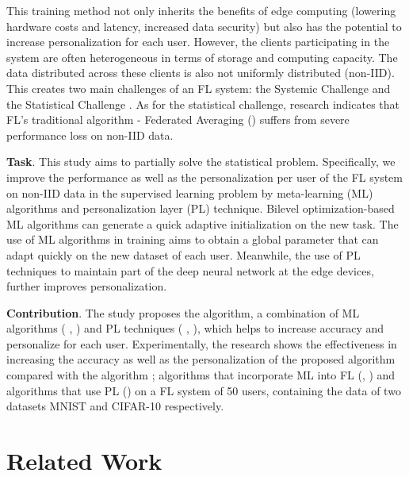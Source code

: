 \documentclass[runningheads]{llncs}
\begin{document}
This training method not only inherits the benefits of edge computing (lowering hardware costs and latency, increased data security) but also has the potential to increase personalization for each user. However, the clients participating in the system are often heterogeneous in terms of storage and computing capacity. The data distributed across these clients is also not uniformly distributed (non-IID). This creates two main challenges of an FL system: the Systemic Challenge and the Statistical Challenge \cite{li2020federated}. As for the statistical challenge, \cite{zhao2018federated} research indicates that FL's traditional algorithm - Federated Averaging () suffers from severe performance loss on non-IID data.

\textbf{Task}. This study aims to partially solve the statistical problem. Specifically, we improve the performance as well as the personalization per user of the FL system on non-IID data in the supervised learning problem by meta-learning (ML) algorithms \cite{hospedales2020meta} and personalization layer (PL) technique. Bilevel optimization-based ML algorithms can generate a quick adaptive initialization on the new task. The use of ML algorithms in training aims to obtain a global parameter that can adapt quickly on the new dataset of each user. Meanwhile, the use of PL techniques to maintain part of the deep neural network at the edge devices, further improves personalization.

\textbf{Contribution}. The study proposes the  algorithm, a combination of ML algorithms ( \cite{finn2017model},  \cite{li2017meta}) and PL techniques ( \cite{arivazhagan2019federated},  \cite{liang2020think}), which helps to increase accuracy and personalize for each user. Experimentally, the research shows the effectiveness in increasing the accuracy as well as the personalization of the proposed algorithm compared with the algorithm ; algorithms that incorporate ML into FL \cite{chen2018federated} (, ) and algorithms that use PL () on a FL system of 50 users, containing the data of two datasets MNIST \cite{deng2012mnist} and CIFAR-10 \cite{krizhevsky2009learning} respectively.

\section{Related Work}
\end{document}
